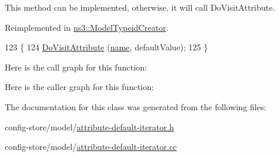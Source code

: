 This method can be implemented, otherwise, it will call Do\+Visit\+Attribute. 



Reimplemented in \hyperlink{classns3_1_1ModelTypeidCreator_af0ede4f2ab9803653302625bf522d150}{ns3\+::\+Model\+Typeid\+Creator}.


\begin{DoxyCode}
123 \{
124   \hyperlink{classns3_1_1AttributeDefaultIterator_ac9f9140de79896832e110f9ea718bd2f}{DoVisitAttribute} (\hyperlink{generate__test__data__lte__spectrum__model_8m_ab74e6bf80237ddc4109968cedc58c151}{name}, defaultValue);
125 \}
\end{DoxyCode}


Here is the call graph for this function\+:




Here is the caller graph for this function\+:




The documentation for this class was generated from the following files\+:\begin{DoxyCompactItemize}
\item 
config-\/store/model/\hyperlink{attribute-default-iterator_8h}{attribute-\/default-\/iterator.\+h}\item 
config-\/store/model/\hyperlink{attribute-default-iterator_8cc}{attribute-\/default-\/iterator.\+cc}\end{DoxyCompactItemize}
